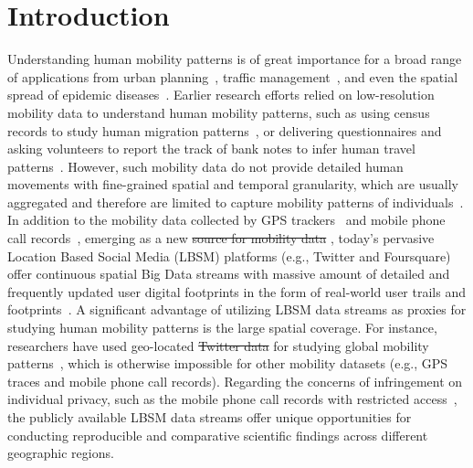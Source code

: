 \documentclass[ijgi,article,submit,moreauthors,pdftex,10pt,a4paper]{mdpi}
\theoremstyle{mdpi}
\newcounter{ex}
\newcounter{re}
\theoremstyle{mdpidefinition}
\providecommand{\DIFadd}[1]{{\protect\color{blue}\uwave{#1}}} %
\providecommand{\DIFdel}[1]{{\protect\color{red}\sout{#1}}}                      %
\providecommand{\DIFaddbegin}{} %
\providecommand{\DIFaddend}{} %
\providecommand{\DIFdelbegin}{} %
\providecommand{\DIFdelend}{} %
\begin{document}


\section{Introduction}
Understanding human mobility patterns is of great importance for a broad range of applications from urban planning~\cite{zheng2008understanding}, traffic management~\cite{jiang2009characterizing}, and even the spatial spread of epidemic diseases~\cite{belik2011natural}.
Earlier research efforts relied on low-resolution mobility data to understand human mobility patterns, such as using census records to study human migration patterns~\cite{greenwood1985human}, or delivering questionnaires and asking volunteers to report the track of bank notes to infer human travel patterns~\cite{brockmann2006scaling}.
However, such mobility data do not provide detailed human movements with fine-grained spatial and temporal granularity, which are usually aggregated and therefore are limited to capture mobility patterns of individuals~\cite{gonzalez2008understanding,Jurdak2015}.
In addition to the mobility data collected by GPS trackers~\cite{zheng2008understanding, rhee2011levy} and mobile phone call records~\cite{gonzalez2008understanding,sevtsuk2010does,kung2014exploring}, emerging as a new \DIFdelbegin \DIFdel{source for mobility data }\DIFdelend \DIFaddbegin \DIFadd{mobility data source}\DIFaddend , today's pervasive Location Based Social Media (LBSM) platforms (e.g., Twitter and Foursquare) offer continuous spatial Big Data streams with massive amount of detailed and frequently updated user digital footprints in the form of real-world user trails and footprints~\cite{thatcher2014living}.
A significant advantage of utilizing LBSM data streams as proxies for studying human mobility patterns is the large spatial coverage.
For instance, researchers have used geo-located \DIFdelbegin \DIFdel{Twitter data }\DIFdelend \DIFaddbegin \DIFadd{tweets }\DIFaddend for studying global mobility patterns~\cite{hawelka2014geo}, which is otherwise impossible for other mobility datasets (e.g., GPS traces and mobile phone call records).
Regarding the concerns of infringement on individual privacy, such as the mobile phone call records with restricted access~\cite{giannotti2008mobility,crampton2014collect,Jurdak2015}, the publicly available LBSM data streams offer unique opportunities for conducting reproducible and comparative scientific findings across different geographic regions.
\end{document}
